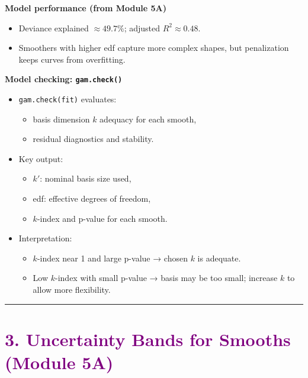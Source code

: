 \documentclass[
  letterpaper,
  DIV=11,
  numbers=noendperiod]{scrreprt}
\providecommand{\tightlist}{%
  \setlength{\itemsep}{0pt}\setlength{\parskip}{0pt}}\usepackage{longtable,booktabs,array}
\begin{document}
\textbf{Model performance (from Module 5A)}

\begin{itemize}
\tightlist
\item
  Deviance explained \(\approx 49.7\%\); adjusted \(R^2 \approx 0.48\).
\item
  Smoothers with higher edf capture more complex shapes, but
  penalization keeps curves from overfitting.
\end{itemize}

\textbf{Model checking: \texttt{gam.check()}}

\begin{itemize}
\tightlist
\item
  \texttt{gam.check(fit)} evaluates:

  \begin{itemize}
  \tightlist
  \item
    basis dimension \(k\) adequacy for each smooth,
  \item
    residual diagnostics and stability.
  \end{itemize}
\item
  Key output:

  \begin{itemize}
  \tightlist
  \item
    \(k'\): nominal basis size used,
  \item
    edf: effective degrees of freedom,
  \item
    \(k\)-index and p-value for each smooth.
  \end{itemize}
\item
  Interpretation:

  \begin{itemize}
  \tightlist
  \item
    \(k\)-index near 1 and large p-value → chosen \(k\) is adequate.
  \item
    Low \(k\)-index with small p-value → basis may be too small;
    increase \(k\) to allow more flexibility.
  \end{itemize}
\end{itemize}

\begin{center}\rule{0.5\linewidth}{0.5pt}\end{center}

\hypertarget{section-45}{%
\section*{\texorpdfstring{\textcolor{purple}{3. Uncertainty Bands for Smooths (Module 5A)}}{}}\label{section-45}}
\end{document}
